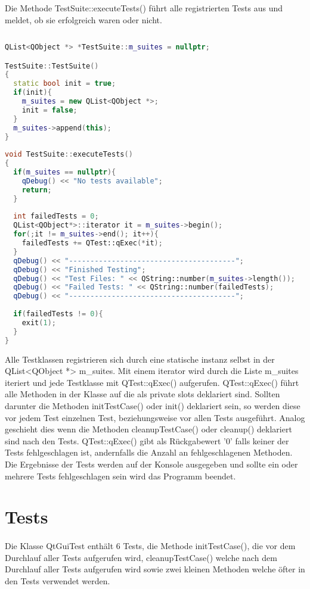 		Die Methode TestSuite::executeTests() führt alle registrierten Tests aus und meldet, ob sie erfolgreich waren oder nicht.
		\begin{lstlisting}[language=C++]
			
QList<QObject *> *TestSuite::m_suites = nullptr;

TestSuite::TestSuite()
{
  static bool init = true;
  if(init){
    m_suites = new QList<QObject *>;
    init = false;
  }
  m_suites->append(this);
}
		
void TestSuite::executeTests()
{
  if(m_suites == nullptr){
    qDebug() << "No tests available";
    return;
  }
	
  int failedTests = 0;
  QList<QObject*>::iterator it = m_suites->begin();
  for(;it != m_suites->end(); it++){
  	failedTests += QTest::qExec(*it);
  }
  qDebug() << "---------------------------------------";
  qDebug() << "Finished Testing";
  qDebug() << "Test Files: " << QString::number(m_suites->length());
  qDebug() << "Failed Tests: " << QString::number(failedTests);
  qDebug() << "---------------------------------------";
	
  if(failedTests != 0){
    exit(1);
  }
}
\end{lstlisting}
		Alle Testklassen registrieren sich durch eine statische instanz selbst in der QList<QObject *> m\_suites. Mit einem iterator wird durch die Liste m\_suites iteriert und jede Testklasse mit QTest::qExec() aufgerufen. QTest::qExec() führt alle Methoden in der Klasse auf die als private slots deklariert sind. Sollten darunter die Methoden initTestCase() oder init() deklariert sein, so werden diese vor jedem Test einzelnen Test, beziehungsweise vor allen Tests ausgeführt. Analog geschieht dies wenn die Methoden cleanupTestCase() oder cleanup() deklariert sind nach den Tests. QTest::qExec() gibt als Rückgabewert '0' falls keiner der Tests fehlgeschlagen ist, andernfalls die Anzahl an fehlgeschlagenen Methoden. Die Ergebnisse der Tests werden auf der Konsole ausgegeben und sollte ein oder mehrere Tests fehlgeschlagen sein wird das Programm beendet.
		
		\newpage
		
		\section{Tests}
		\paragraph{} Die Klasse QtGuiTest enthält 6 Tests, die Methode initTestCase(), die vor dem Durchlauf aller Tests aufgerufen wird, cleanupTestCase() welche nach dem Durchlauf aller Tests aufgerufen wird sowie zwei kleinen Methoden welche öfter in den Tests verwendet werden.
		
